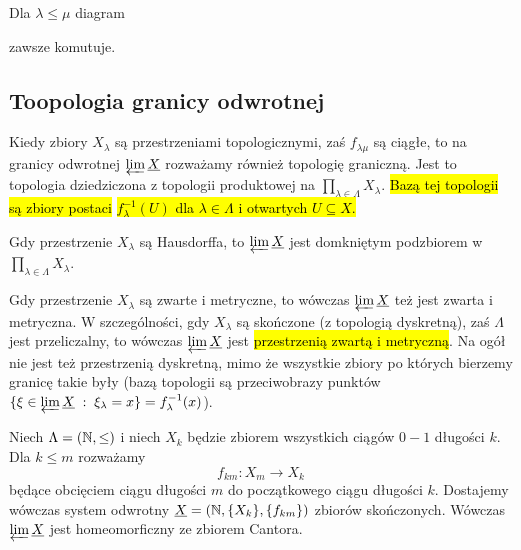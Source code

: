 \begin{center}
\end{center}

Dla $\lambda\leq\mu$ diagram 
\begin{center}
\end{center}
zawsze komutuje.

\subsection{Toopologia granicy odwrotnej}

Kiedy zbiory $X_\lambda$ są przestrzeniami topologicznymi, zaś $f_{\lambda\mu}$ są ciągłe, to na granicy odwrotnej $\varprojlim\underline{X}$ rozważamy również topologię graniczną. Jest to topologia dziedziczona z topologii produktowej na $\prod_{\lambda\in\Lambda}X_\lambda$. \hl{Bazą tej topologii są zbiory postaci }\hl{$f_\lambda^{-1}(U)$ dla $\lambda\in\Lambda$ i otwartych $U\subseteq X$.}

\begin{fact}{}{}
  Gdy przestrzenie $X_\lambda$ są Hausdorffa, to $\varprojlim \underline{X}$ jest domkniętym podzbiorem w $\prod_{\lambda\in\Lambda}X_\lambda$.
\end{fact}

Gdy przestrzenie $X_\lambda$ są zwarte i metryczne, to wówczas $\varprojlim\underline{X}$ też jest zwarta i metryczna. W szczególności, gdy $X_\lambda$ są skończone (z topologią dyskretną), zaś $\Lambda$ jest przeliczalny, to wówczas $\varprojlim\underline{X}$ jest \hl{przestrzenią zwartą i metryczną}. Na ogół nie jest też przestrzenią dyskretną, mimo że wszystkie zbiory po których bierzemy granicę takie były (bazą topologii są przeciwobrazy punktów $\{\xi\in\varprojlim\underline{X}\;:\;\xi_\lambda=x\}=f^{-1}_\lambda(x)$).

\begin{example}{}{}
  Niech $\Lambda=(\mathbb{N}, \leq)$ i niech $X_k$ będzie zbiorem wszystkich ciągów $0-1$ długości $k$. Dla $k\leq m$ rozważamy 
  $$f_{km}:X_m\to X_k$$
  będące obcięciem ciągu długości $m$ do początkowego ciągu długości $k$. Dostajemy wówczas system odwrotny $\underline{X}=(\mathbb{N}, \{X_k\}, \{f_{km}\})$ zbiorów skończonych. Wówczas $\varprojlim\underline{X}$ jest homeomorficzny ze zbiorem Cantora.
\end{example}

